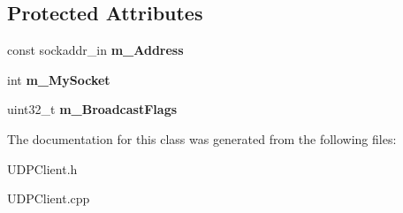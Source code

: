 \subsection*{Protected Attributes}
\begin{DoxyCompactItemize}
\item 
\mbox{\label{classTBT_1_1UDPClient_a880ede9d0208905a251bbfd221646e3b}} 
const sockaddr\+\_\+in {\bfseries m\+\_\+\+Address}
\item 
\mbox{\label{classTBT_1_1UDPClient_aef66ad83fa20b995152c6f41cb8ba91f}} 
int {\bfseries m\+\_\+\+My\+Socket}
\item 
\mbox{\label{classTBT_1_1UDPClient_a91eb8f34a9606428eba7230c2bfdb6f6}} 
uint32\+\_\+t {\bfseries m\+\_\+\+Broadcast\+Flags}
\end{DoxyCompactItemize}


The documentation for this class was generated from the following files\+:\begin{DoxyCompactItemize}
\item 
U\+D\+P\+Client.\+h\item 
U\+D\+P\+Client.\+cpp\end{DoxyCompactItemize}
